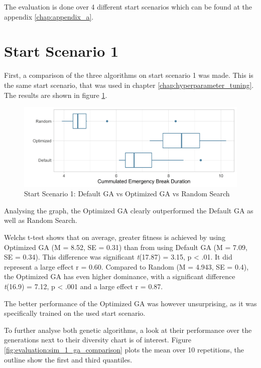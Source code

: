 The evaluation is done over 4 different start scenarios which can be found at the appendix \ref{chap:appendix_a}.

\section{Start Scenario 1}
First, a comparison of the three algorithms on start scenario 1 was made. This is the same start scenario, that was used in chapter \ref{chap:hyperparameter_tuning}. The results are shown in figure \ref{fig:evaluation:sim_1_comparison}.

\begin{figure}[ht] 
	\label{fig:evaluation:sim_1_comparison}
	\includegraphics[width=1\linewidth]{simulations/evaluation/plots/sim_1_comparison}
	\caption{Start Scenario 1: Default GA vs Optimized GA vs Random Search}
\end{figure}

Analysing the graph, the Optimized GA clearly outperformed the Default GA as well as Random Search.

Welchs t-test shows that on average, greater fitness is achieved by using Optimized GA (M = 8.52, SE = 0.31) than from using Default GA (M = 7.09, SE = 0.34). This difference was significant \textit{t}(17.87) = 3.15, p < .01. It did represent a large effect r = 0.60.
Compared to Random (M = 4.943, SE = 0.4), the Optimized GA has even higher dominance, with a significant difference \textit{t}(16.9) = 7.12, p < .001 and a large effect r = 0.87.

The better performance of the Optimized GA was however unsurprising, as it was specifically trained on the used start scenario.

To further analyse both genetic algorithms, a look at their performance over the generations next to their diversity chart is of interest. Figure \ref{fig:evaluation:sim_1_ga_comparison} plots the mean over 10 repetitions, the outline show the first and third quantiles.

